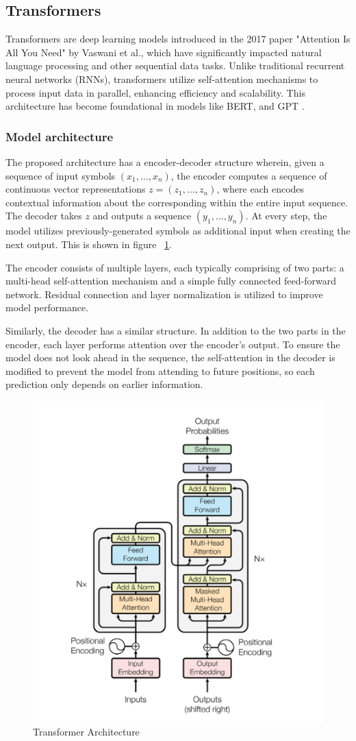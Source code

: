 \documentclass[licencjacka,en]{pracamgr}
\begin{document}
\subsection{Transformers}
Transformers are deep learning models introduced in the 2017 paper "Attention Is All You Need" by Vaswani et al., which have significantly impacted natural language processing and other sequential data tasks. Unlike traditional recurrent neural networks (RNNs), transformers utilize self-attention mechanisms to process input data in parallel, enhancing efficiency and scalability. This architecture has become foundational in models like BERT, and GPT \cite{medium_t}.
\subsubsection{Model architecture}
The proposed architecture has a encoder-decoder structure wherein, given a sequence of input symbols $ (x_1, … , x_n) $, the encoder computes a sequence of continuous vector representations $ z = (z_1, … , z_n) $, where each encodes contextual information about the corresponding within the entire input sequence. The decoder takes $ z $ and outputs a sequence $ (y_1, … , y_n) $. At every step, the model utilizes previously-generated symbols as additional input when creating the next output. This is shown in figure ~\ref{fig:transformers_fig}. 

The encoder consists of multiple layers, each typically comprising of two parts: a multi-head self-attention mechanism and a simple fully connected feed-forward network. Residual connection and layer normalization is utilized to improve model performance. 

Similarly, the decoder has a similar structure. In addition to the two parts in the encoder, each layer performs attention over the encoder’s output. To ensure the model does not look ahead in the sequence, the self-attention in the decoder is modified to prevent the model from attending to future positions, so each prediction only depends on earlier information.

\begin{figure}
    \centering
    \includegraphics[width=0.5\linewidth]{bachelor_images/transformer_arch.png}
    \caption{Transformer Architecture \cite{attention}}
    \label{fig:transformers_fig}
\end{figure}
\end{document}
